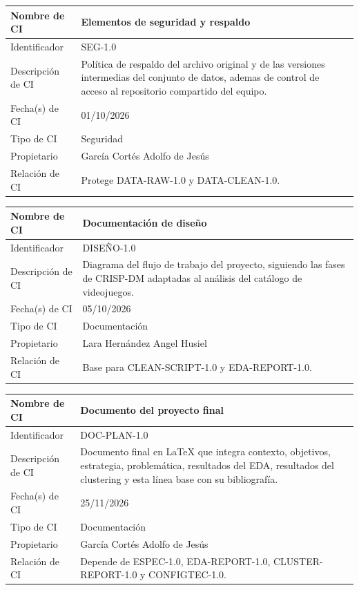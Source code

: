 \documentclass[letterpaper,11pt]{article}
\begin{document}
\noindent\begin{minipage}{\textwidth}
\small\renewcommand{\arraystretch}{1.9}
\begin{tabularx}{\textwidth}{|p{3.3cm}|Y|}
\hline
Nombre de CI & Elementos de seguridad y respaldo \\ \hline
Identificador & SEG-1.0 \\ \hline
Descripción de CI & Política de respaldo del archivo original y de las versiones intermedias del conjunto de datos, ademas de control de acceso al repositorio compartido del equipo. \\ \hline
Fecha(s) de CI & 01/10/2026 \\ \hline
Tipo de CI & Seguridad \\ \hline
Propietario & García Cortés Adolfo de Jesús \\ \hline
Relación de CI & Protege DATA-RAW-1.0 y DATA-CLEAN-1.0. \\ \hline
\end{tabularx}
\end{minipage}\par\bigskip
\noindent\begin{minipage}{\textwidth}
\small\renewcommand{\arraystretch}{1.9}
\begin{tabularx}{\textwidth}{|p{3.3cm}|Y|}
\hline
Nombre de CI & Documentación de diseño \\ \hline
Identificador & DISEÑO-1.0 \\ \hline
Descripción de CI & Diagrama del flujo de trabajo del proyecto, siguiendo las fases de CRISP-DM adaptadas al análisis del catálogo de videojuegos. \\ \hline
Fecha(s) de CI & 05/10/2026 \\ \hline
Tipo de CI & Documentación \\ \hline
Propietario & Lara Hernández Angel Husiel \\ \hline
Relación de CI & Base para CLEAN-SCRIPT-1.0 y EDA-REPORT-1.0. \\ \hline
\end{tabularx}
\end{minipage}\par\bigskip
\noindent\begin{minipage}{\textwidth}
\small\renewcommand{\arraystretch}{1.9}
\begin{tabularx}{\textwidth}{|p{3.3cm}|Y|}
\hline
Nombre de CI & Documento del proyecto final \\ \hline
Identificador & DOC-PLAN-1.0 \\ \hline
Descripción de CI & Documento final en LaTeX que integra contexto, objetivos, estrategia, problemática, resultados del EDA, resultados del clustering y esta línea base con su bibliografía. \\ \hline
Fecha(s) de CI & 25/11/2026 \\ \hline
Tipo de CI & Documentación \\ \hline
Propietario & García Cortés Adolfo de Jesús \\ \hline
Relación de CI & Depende de ESPEC-1.0, EDA-REPORT-1.0, CLUSTER-REPORT-1.0 y CONFIGTEC-1.0. \\ \hline
\end{tabularx}
\end{minipage}\par\bigskip
\end{document}
